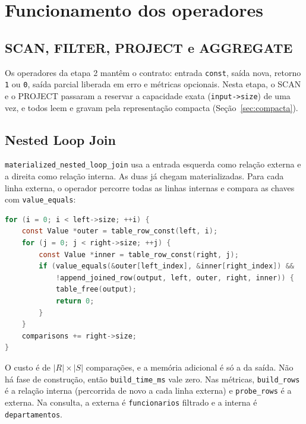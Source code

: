 \documentclass[11pt,a4paper]{article}
\begin{document}
\section{Funcionamento dos operadores}

\subsection{SCAN, FILTER, PROJECT e AGGREGATE}
Os operadores da etapa 2 mantêm o contrato: entrada \texttt{const}, saída nova, retorno \texttt{1} ou \texttt{0}, saída parcial liberada em erro e métricas opcionais. Nesta etapa, o SCAN e o PROJECT passaram a reservar a capacidade exata (\texttt{input->size}) de uma vez, e todos leem e gravam pela representação compacta (Seção~\ref{sec:compacta}).

\subsection{Nested Loop Join}
\texttt{materialized\_nested\_loop\_join} usa a entrada esquerda como relação externa e a direita como relação interna. As duas já chegam materializadas. Para cada linha externa, o operador percorre todas as linhas internas e compara as chaves com \texttt{value\_equals}:
\par\medskip\noindent\begin{minipage}{\linewidth}
\begin{lstlisting}[language=C]
for (i = 0; i < left->size; ++i) {
    const Value *outer = table_row_const(left, i);
    for (j = 0; j < right->size; ++j) {
        const Value *inner = table_row_const(right, j);
        if (value_equals(&outer[left_index], &inner[right_index]) &&
            !append_joined_row(output, left, outer, right, inner)) {
            table_free(output);
            return 0;
        }
    }
    comparisons += right->size;
}
\end{lstlisting}
\end{minipage}\par\medskip
O custo é de $|R| \times |S|$ comparações, e a memória adicional é só a da saída. Não há fase de construção, então \texttt{build\_time\_ms} vale zero. Nas métricas, \texttt{build\_rows} é a relação interna (percorrida de novo a cada linha externa) e \texttt{probe\_rows} é a externa. Na consulta, a externa é \texttt{funcionarios} filtrado e a interna é \texttt{departamentos}.
\end{document}
